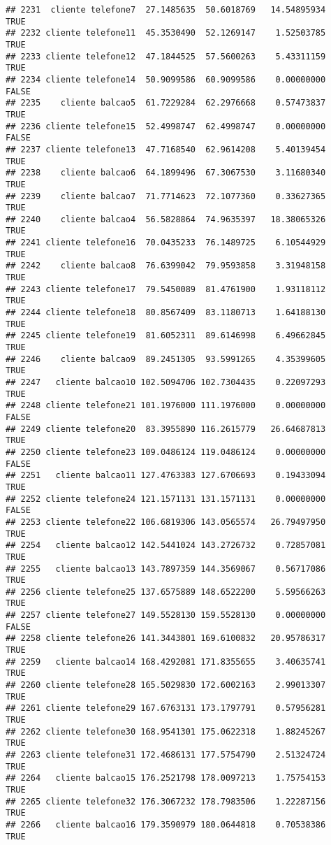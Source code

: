 \documentclass[
]{article}
\begin{document}
\begin{verbatim}
## 2231  cliente telefone7  27.1485635  50.6018769   14.54895934     TRUE
## 2232 cliente telefone11  45.3530490  52.1269147    1.52503785     TRUE
## 2233 cliente telefone12  47.1844525  57.5600263    5.43311159     TRUE
## 2234 cliente telefone14  50.9099586  60.9099586    0.00000000    FALSE
## 2235    cliente balcao5  61.7229284  62.2976668    0.57473837     TRUE
## 2236 cliente telefone15  52.4998747  62.4998747    0.00000000    FALSE
## 2237 cliente telefone13  47.7168540  62.9614208    5.40139454     TRUE
## 2238    cliente balcao6  64.1899496  67.3067530    3.11680340     TRUE
## 2239    cliente balcao7  71.7714623  72.1077360    0.33627365     TRUE
## 2240    cliente balcao4  56.5828864  74.9635397   18.38065326     TRUE
## 2241 cliente telefone16  70.0435233  76.1489725    6.10544929     TRUE
## 2242    cliente balcao8  76.6399042  79.9593858    3.31948158     TRUE
## 2243 cliente telefone17  79.5450089  81.4761900    1.93118112     TRUE
## 2244 cliente telefone18  80.8567409  83.1180713    1.64188130     TRUE
## 2245 cliente telefone19  81.6052311  89.6146998    6.49662845     TRUE
## 2246    cliente balcao9  89.2451305  93.5991265    4.35399605     TRUE
## 2247   cliente balcao10 102.5094706 102.7304435    0.22097293     TRUE
## 2248 cliente telefone21 101.1976000 111.1976000    0.00000000    FALSE
## 2249 cliente telefone20  83.3955890 116.2615779   26.64687813     TRUE
## 2250 cliente telefone23 109.0486124 119.0486124    0.00000000    FALSE
## 2251   cliente balcao11 127.4763383 127.6706693    0.19433094     TRUE
## 2252 cliente telefone24 121.1571131 131.1571131    0.00000000    FALSE
## 2253 cliente telefone22 106.6819306 143.0565574   26.79497950     TRUE
## 2254   cliente balcao12 142.5441024 143.2726732    0.72857081     TRUE
## 2255   cliente balcao13 143.7897359 144.3569067    0.56717086     TRUE
## 2256 cliente telefone25 137.6575889 148.6522200    5.59566263     TRUE
## 2257 cliente telefone27 149.5528130 159.5528130    0.00000000    FALSE
## 2258 cliente telefone26 141.3443801 169.6100832   20.95786317     TRUE
## 2259   cliente balcao14 168.4292081 171.8355655    3.40635741     TRUE
## 2260 cliente telefone28 165.5029830 172.6002163    2.99013307     TRUE
## 2261 cliente telefone29 167.6763131 173.1797791    0.57956281     TRUE
## 2262 cliente telefone30 168.9541301 175.0622318    1.88245267     TRUE
## 2263 cliente telefone31 172.4686131 177.5754790    2.51324724     TRUE
## 2264   cliente balcao15 176.2521798 178.0097213    1.75754153     TRUE
## 2265 cliente telefone32 176.3067232 178.7983506    1.22287156     TRUE
## 2266   cliente balcao16 179.3590979 180.0644818    0.70538386     TRUE

\end{verbatim}
\end{document}
